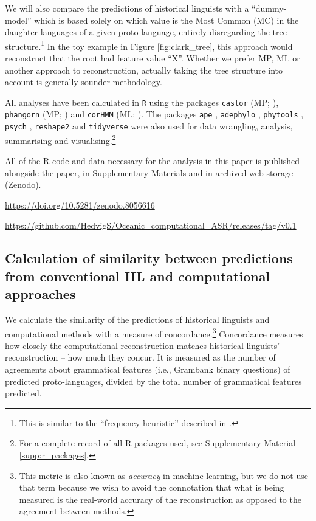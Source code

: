 \documentclass[12pt,letterpaper]{article}
\begin{document}
We will also compare the predictions of historical linguists with a ``dummy-model'' which is based solely on which value is the Most Common (MC) in the daughter languages of a given proto-language, entirely disregarding the tree structure.\footnote{This is similar to the ``frequency heuristic'' described in \citet{goldstein_2022}.} In the toy example in Figure \ref{fig:clark_tree}, this approach would reconstruct that the root had feature value ``X''. Whether we prefer MP, ML or another approach to reconstruction, actually taking the tree structure into account is generally sounder methodology. %

All analyses have been calculated in \texttt{R} \citep{R} using the packages \texttt{castor} (MP; \citet{louca2017efficient}), \texttt{phangorn} (MP; \citealt{phangorn}) and \texttt{corHMM} (ML; \citealt{R-corHMM}). The packages \texttt{ape} \citep{paradis2004ape}, \texttt{adephylo} \citep{jombart2017package}, \texttt{phytools} \citep{revell2012phytools}, \texttt{psych} \citep{psych_r_package},  \texttt{reshape2} \citep{wickham2020reshape2} and \texttt{tidyverse} \citep{tidyverse13} were also used for data wrangling, analysis, summarising and visualising.\footnote{For a complete record of all R-packages used, see Supplementary Material \ref{supp:r_packages}.}

All of the R code and data necessary for the analysis in this paper is published alongside the paper, in Supplementary Materials and in archived web-storage (Zenodo).

\url{https://doi.org/10.5281/zenodo.8056616}

\url{https://github.com/HedvigS/Oceanic_computational_ASR/releases/tag/v0.1}

 \FloatBarrier
\subsection{Calculation of similarity between predictions from conventional HL and computational approaches}
\label{result_calc_section}
We calculate the similarity of the predictions of historical linguists and computational methods with a measure of concordance.\footnote{This metric is also known as \textit{accuracy} in machine learning, but we do not use that term because we wish to avoid the connotation that what is being measured is the real-world accuracy of the reconstruction as opposed to the agreement between methods.} Concordance measures how closely the computational reconstruction matches historical linguists' reconstruction -- how much they concur. It is measured as the number of agreements about grammatical features (i.e., Grambank binary questions) of predicted proto-languages, divided by the total number of grammatical features predicted. 
\end{document}
